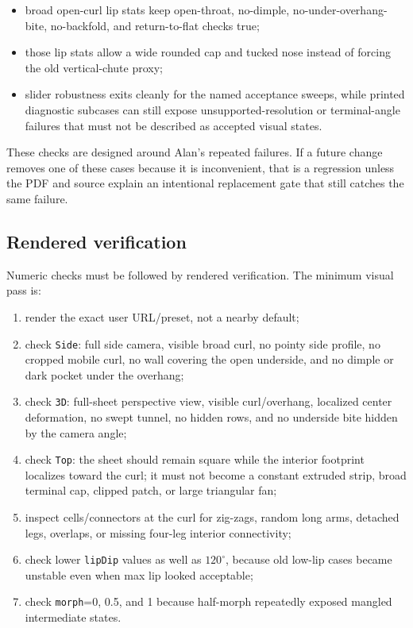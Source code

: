 \documentclass[12pt,letterpaper]{article}
\newcommand{\code}[1]{\texttt{#1}}
\begin{document}
\begin{itemize}
  \item broad open-curl lip stats keep open-throat, no-dimple, no-under-overhang-bite, no-backfold, and return-to-flat checks true;
  \item those lip stats allow a wide rounded cap and tucked nose instead of forcing the old vertical-chute proxy;
  \item slider robustness exits cleanly for the named acceptance sweeps, while printed diagnostic subcases can still expose unsupported-resolution or terminal-angle failures that must not be described as accepted visual states.
\end{itemize}

These checks are designed around Alan's repeated failures. If a future change removes one of these cases because it is inconvenient, that is a regression unless the PDF and source explain an intentional replacement gate that still catches the same failure.

\subsection{Rendered verification}

Numeric checks must be followed by rendered verification. The minimum visual pass is:
\begin{enumerate}
  \item render the exact user URL/preset, not a nearby default;
  \item check \code{Side}: full side camera, visible broad curl, no pointy side profile, no cropped mobile curl, no wall covering the open underside, and no dimple or dark pocket under the overhang;
  \item check \code{3D}: full-sheet perspective view, visible curl/overhang, localized center deformation, no swept tunnel, no hidden rows, and no underside bite hidden by the camera angle;
  \item check \code{Top}: the sheet should remain square while the interior footprint localizes toward the curl; it must not become a constant extruded strip, broad terminal cap, clipped patch, or large triangular fan;
  \item inspect cells/connectors at the curl for zig-zags, random long arms, detached legs, overlaps, or missing four-leg interior connectivity;
  \item check lower \code{lipDip} values as well as \(120^\circ\), because old low-lip cases became unstable even when max lip looked acceptable;
  \item check \code{morph}=0, 0.5, and 1 because half-morph repeatedly exposed mangled intermediate states.
\end{enumerate}
\end{document}
